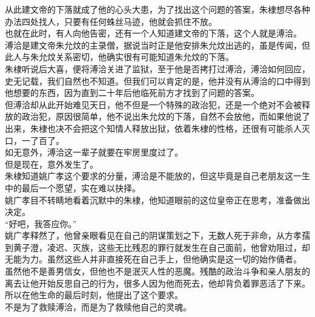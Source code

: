 \begin{multicols}{\theparacolNo}
从此建文帝的下落就成了他的心头大患，为了找出这个问题的答案，朱棣想尽各种办法四处找人，只要有任何蛛丝马迹，他就会抓住不放。\\

也就在此时，有人向他告密，还有一个人知道建文帝的下落，这个人就是溥洽。\\

溥洽是建文帝朱允炆的主录僧，据说当时正是他安排朱允炆出逃的，虽是传闻，但此人与朱允炆关系密切，他确实很有可能知道朱允炆的下落。\\

朱棣听说后大喜，便将溥洽关进了监狱，至于他是否拷打过溥洽，溥洽如何回应，史无记载，我们自然也不知道。但我们可以肯定的是，他并没有从溥洽的口中得到他想要的东西，因为直到二十年后他临死前方才找到了问题的答案。\\

但溥洽却从此开始难见天日，他不但是一个特殊的政治犯，还是一个绝对不会被释放的政治犯，原因很简单，他不说出朱允炆的下落，自然不会放他，而如果他说了出来，朱棣也决不会把这个知情人释放出狱，依着朱棣的性格，还很有可能杀人灭口，一了百了。\\

如无意外，溥洽这一辈子就要在牢房里度过了。\\

但是现在，意外发生了。\\

朱棣知道姚广孝这个要求的分量，溥洽是不能放的，但这毕竟是自己老朋友这一生中的最后一个愿望，实在难以抉择。\\

姚广孝目不转睛地看着沉默中的朱棣，他知道眼前的这位皇帝正在思考，准备做出决定。\\

“好吧，我答应你。”\\

姚广孝释然了，他曾亲眼看见在自己的阴谋策划之下，无数人死于非命，从方孝孺到黄子澄，凌迟、灭族，这些无比残忍的罪行就发生在自己面前，他曾劝阻过，却无能为力。虽然这些人并非直接死在自己手上，但他确实是这一切的始作俑者。\\

虽然他不是善男信女，但他也不是泯灭人性的恶魔。残酷的政治斗争和亲人朋友的离去让他开始反思自己的行为，很多人因为他而死去，他却背负着罪恶活了下来。\\

所以在他生命的最后时刻，他提出了这个要求。\\

不是为了救赎溥洽，而是为了救赎他自己的灵魂。\\


\end{multicols}
